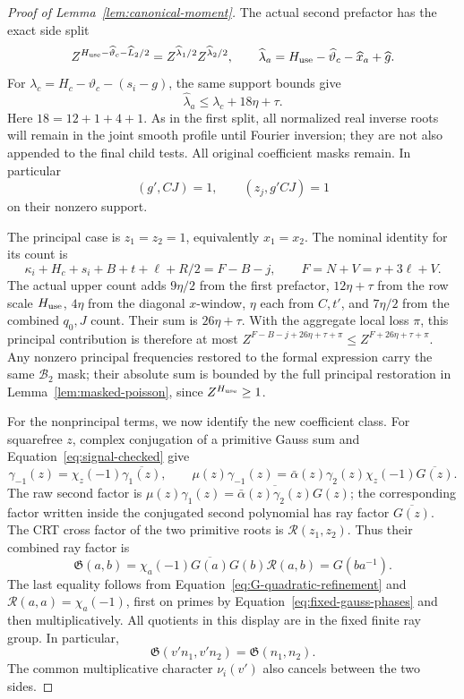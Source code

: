 \documentclass[12pt]{article}
\begin{document}
\begin{proof}[Proof of Lemma~\ref{lem:canonical-moment}]
The actual second prefactor has the exact side split
\[
 Z^{H_{\rm use}-\widehat\vartheta_c-\widehat L_2/2}
       =Z^{\widehat\lambda_1/2}Z^{\widehat\lambda_2/2},
 \qquad \widehat\lambda_a=H_{\rm use}-\widehat\vartheta_c-\widehat x_a+
                           \widehat g.
\]
For \(\lambda_c=H_c-\vartheta_c-(s_i-g)\), the same support bounds give
\begin{equation}\label{eq:inverse-second-prefactor-error}
 \widehat\lambda_a\le\lambda_c+18\eta+\tau.
\end{equation}
Here \(18=12+1+4+1\).  As in the first split, all normalized real
inverse roots will remain in the joint smooth profile until Fourier
inversion; they are not also appended to the final child tests.
All original coefficient masks remain.  In particular
\[
 (g',CJ)=1,\qquad (z_j,g'CJ)=1
\]
on their nonzero support.

The principal case is \(z_1=z_2=1\), equivalently \(x_1=x_2\).
The nominal identity for its count is
\begin{equation}\label{eq:second-principal-exponent}
 \kappa_i+H_c+s_i+B+t+\ell+R/2=F-B-j,
 \qquad F=N+V=r+3\ell+V.
\end{equation}
The actual upper count adds \(9\eta/2\) from the first prefactor,
\(12\eta+\tau\) from the row scale \(H_{\rm use}\), \(4\eta\) from the
diagonal \(x\)-window, \(\eta\) each from \(C,t'\), and \(7\eta/2\) from
the combined \(q_0,J\) count.  Their sum is \(26\eta+\tau\).  With the
aggregate local loss \(\pi\), this principal contribution is therefore
at most \(Z^{F-B-j+26\eta+\tau+\pi}\le Z^{F+26\eta+\tau+\pi}\).
Any nonzero principal frequencies restored to the formal expression carry
the same \(\mathcal B_2\) mask; their absolute sum is bounded by the full
principal restoration in Lemma~\ref{lem:masked-poisson}, since
\(Z^{H_{\rm use}}\ge1\).

For the nonprincipal terms, we now identify the new coefficient
class.  For squarefree \(z\), complex conjugation of a primitive
Gauss sum and Equation~\eqref{eq:signal-checked} give
\[
 \gamma_{-1}(z)=\chi_z(-1)\overline{\gamma_1(z)},\qquad
 \mu(z)\gamma_{-1}(z)
 =\bar\alpha(z)\gamma_2(z)\chi_z(-1)\overline{G(z)}.
\]
The raw second factor is
\(\mu(z)\gamma_1(z)=\overline{\bar\alpha(z)\gamma_2(z)}G(z)\);
the corresponding factor written inside the conjugated second
polynomial has ray factor \(\overline{G(z)}\).  The CRT cross factor of the two primitive
roots is \(\mathcal R(z_1,z_2)\).  Thus their combined ray factor is
\[
 \mathfrak G(a,b)=\chi_a(-1)\overline{G(a)}G(b)\mathcal R(a,b)
       =G(ba^{-1}).
\]
The last equality follows from
Equation~\eqref{eq:G-quadratic-refinement} and
\(\mathcal R(a,a)=\chi_a(-1)\), first on primes by
Equation~\eqref{eq:fixed-gauss-phases} and then multiplicatively.
All quotients in this display are in the fixed finite ray group.
In particular,
\[
 \mathfrak G(v'n_1,v'n_2)=\mathfrak G(n_1,n_2).
\]
The common multiplicative character \(\nu_i(v')\) also cancels
between the two sides.


\end{proof}
\end{document}
